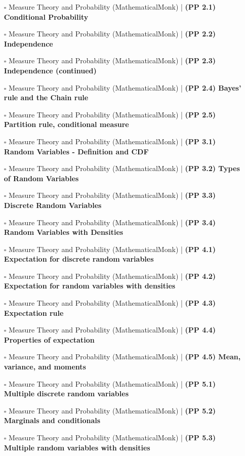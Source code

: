 \documentclass[a4, landscape, 12pt]{article}
\newcommand{\checkbox}{$\square$}%
\begin{document}
\begin{itemize}
{}
\item [\checkbox] Measure Theory and Probability (MathematicalMonk)  | \textbf{(PP 2.1) Conditional Probability
}
\item [\checkbox] Measure Theory and Probability (MathematicalMonk)  | \textbf{(PP 2.2) Independence
}
\item [\checkbox] Measure Theory and Probability (MathematicalMonk)  | \textbf{(PP 2.3) Independence (continued)
}
\item [\checkbox] Measure Theory and Probability (MathematicalMonk)  | \textbf{(PP 2.4) Bayes' rule and the Chain rule
}
\item [\checkbox] Measure Theory and Probability (MathematicalMonk)  | \textbf{(PP 2.5) Partition rule, conditional measure
}
\item [\checkbox] Measure Theory and Probability (MathematicalMonk)  | \textbf{(PP 3.1) Random Variables - Definition and CDF
}
\item [\checkbox] Measure Theory and Probability (MathematicalMonk)  | \textbf{(PP 3.2) Types of Random Variables
}
\item [\checkbox] Measure Theory and Probability (MathematicalMonk)  | \textbf{(PP 3.3) Discrete Random Variables
}
\item [\checkbox] Measure Theory and Probability (MathematicalMonk)  | \textbf{(PP 3.4) Random Variables with Densities
}
\item [\checkbox] Measure Theory and Probability (MathematicalMonk)  | \textbf{(PP 4.1) Expectation for discrete random variables
}
\item [\checkbox] Measure Theory and Probability (MathematicalMonk)  | \textbf{(PP 4.2) Expectation for random variables with densities
}
\item [\checkbox] Measure Theory and Probability (MathematicalMonk)  | \textbf{(PP 4.3) Expectation rule
}
\item [\checkbox] Measure Theory and Probability (MathematicalMonk)  | \textbf{(PP 4.4) Properties of expectation
}
\item [\checkbox] Measure Theory and Probability (MathematicalMonk)  | \textbf{(PP 4.5) Mean, variance, and moments
}
\item [\checkbox] Measure Theory and Probability (MathematicalMonk)  | \textbf{(PP 5.1) Multiple discrete random variables
}
\item [\checkbox] Measure Theory and Probability (MathematicalMonk)  | \textbf{(PP 5.2) Marginals and conditionals
}
\item [\checkbox] Measure Theory and Probability (MathematicalMonk)  | \textbf{(PP 5.3) Multiple random variables with densities
}
\end{itemize}
\end{document}
